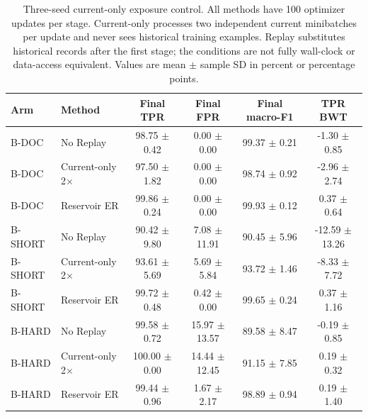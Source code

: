 \begin{table}[t]
\caption{Three-seed current-only exposure control. All methods have 100 optimizer updates per stage. Current-only processes two independent current minibatches per update and never sees historical training examples. Replay substitutes historical records after the first stage; the conditions are not fully wall-clock or data-access equivalent. Values are mean $\pm$ sample SD in percent or percentage points.}
\label{tab:r2-compute}

\centering\small
\begin{tabular}{llcccc}
\toprule
Arm & Method & Final TPR & Final FPR & Final macro-F1 & TPR BWT \\
\midrule
B-DOC & No Replay & 98.75 $\pm$ 0.42 & 0.00 $\pm$ 0.00 & 99.37 $\pm$ 0.21 & -1.30 $\pm$ 0.85 \\
B-DOC & Current-only 2$\times$ & 97.50 $\pm$ 1.82 & 0.00 $\pm$ 0.00 & 98.74 $\pm$ 0.92 & -2.96 $\pm$ 2.74 \\
B-DOC & Reservoir ER & 99.86 $\pm$ 0.24 & 0.00 $\pm$ 0.00 & 99.93 $\pm$ 0.12 & 0.37 $\pm$ 0.64 \\
\midrule
B-SHORT & No Replay & 90.42 $\pm$ 9.80 & 7.08 $\pm$ 11.91 & 90.45 $\pm$ 5.96 & -12.59 $\pm$ 13.26 \\
B-SHORT & Current-only 2$\times$ & 93.61 $\pm$ 5.69 & 5.69 $\pm$ 5.84 & 93.72 $\pm$ 1.46 & -8.33 $\pm$ 7.72 \\
B-SHORT & Reservoir ER & 99.72 $\pm$ 0.48 & 0.42 $\pm$ 0.00 & 99.65 $\pm$ 0.24 & 0.37 $\pm$ 1.16 \\
\midrule
B-HARD & No Replay & 99.58 $\pm$ 0.72 & 15.97 $\pm$ 13.57 & 89.58 $\pm$ 8.47 & -0.19 $\pm$ 0.85 \\
B-HARD & Current-only 2$\times$ & 100.00 $\pm$ 0.00 & 14.44 $\pm$ 12.45 & 91.15 $\pm$ 7.85 & 0.19 $\pm$ 0.32 \\
B-HARD & Reservoir ER & 99.44 $\pm$ 0.96 & 1.67 $\pm$ 2.17 & 98.89 $\pm$ 0.94 & 0.19 $\pm$ 1.40 \\
\bottomrule
\end{tabular}


\end{table}

